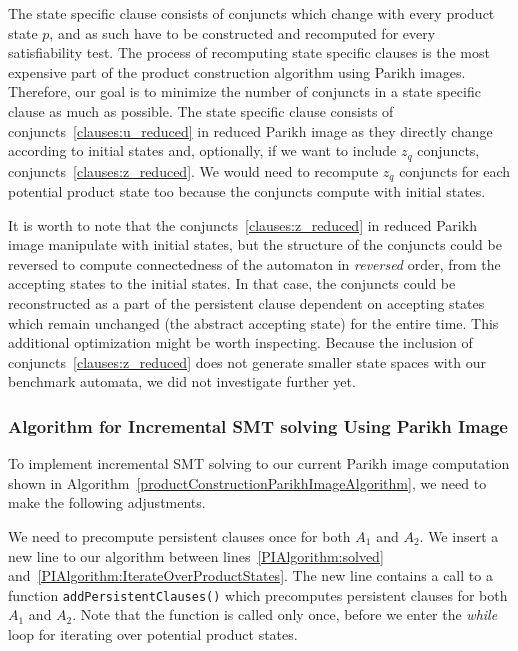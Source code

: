 The state specific clause consists of conjuncts which change with every product state $p$, and as such have to be constructed and recomputed for every satisfiability test. The process of recomputing state specific clauses is the most expensive part of the product construction algorithm using Parikh images. Therefore, our goal is to minimize the number of conjuncts in a state specific clause as much as possible. The state specific clause consists of conjuncts~\ref{clauses:u_reduced} in reduced Parikh image as they directly change according to initial states and, optionally, if we want to include $z_{q}$ conjuncts, conjuncts~\ref{clauses:z_reduced}. We would need to recompute $z_{q}$ conjuncts for each potential product state too because the conjuncts compute with initial states.

It is worth to note that the conjuncts~\ref{clauses:z_reduced} in reduced Parikh image manipulate with initial states, but the structure of the conjuncts could be reversed to compute connectedness of the automaton in \emph{reversed} order, from the accepting states to the initial states. In that case, the conjuncts could be reconstructed as a part of the persistent clause dependent on accepting states which remain unchanged (the abstract accepting state) for the entire time. This additional optimization might be worth inspecting. Because the inclusion of conjuncts~\ref{clauses:z_reduced} does not generate smaller state spaces with our benchmark automata, we did not investigate further yet.

\subsubsection{Algorithm for Incremental SMT solving Using Parikh Image}


To implement incremental SMT solving to our current Parikh image computation shown in Algorithm~\ref{productConstructionParikhImageAlgorithm}, we need to make the following adjustments.

We need to precompute persistent clauses once for both $A_1$ and $A_2$. We insert a new line to our algorithm between lines~\ref{PIAlgorithm:solved} and~\ref{PIAlgorithm:IterateOverProductStates}. The new line contains a call to a function \texttt{addPersistentClauses()} which precomputes persistent clauses for both $A_1$ and $A_2$. Note that the function is called only once, before we enter the \emph{while} loop for iterating over potential product states.

